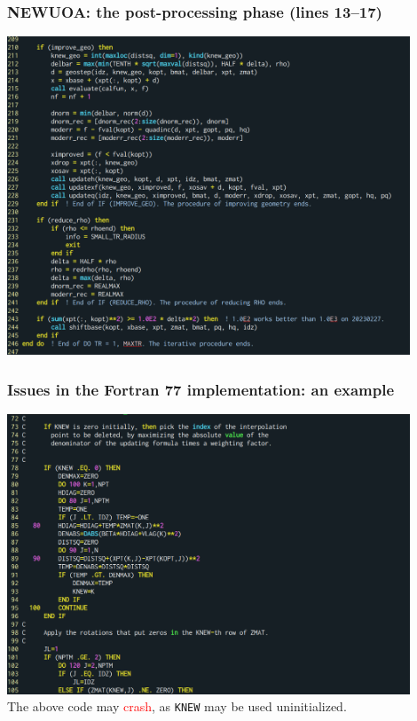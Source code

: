 \documentclass[slidestop,mathserif,xcolor=dvipsnames]{beamer}
\newcommand{\red}[1]{\textcolor{red}{#1}}
\begin{document}
\begin{frame}
    \frametitle{NEWUOA: the post-processing phase (lines 13--17)}
    \vspace{-2ex}
    \begin{center}
        \includegraphics[width=0.9\textwidth]{newuoa_post.png}
    \end{center}
\end{frame}

\begin{frame}
    \frametitle{Issues in the Fortran 77 implementation: an example}
    \vspace{-1ex}
    \begin{center}
        \includegraphics[width=0.9\textwidth]{lincoa_knew.png}
        \\[0.2ex]The above code may \red{crash}, as \texttt{KNEW} may be used uninitialized.
    \end{center}
\end{frame}
\end{document}
